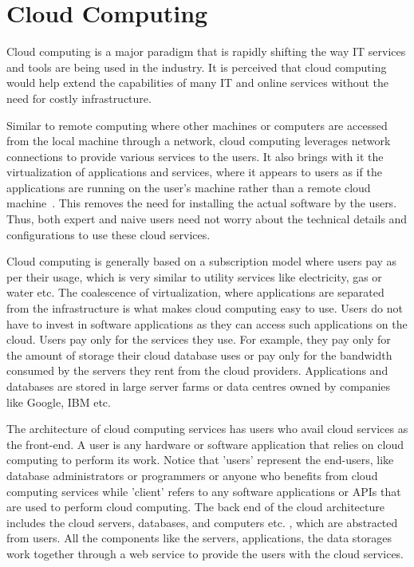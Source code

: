 \section{Cloud Computing} \label{s:cloudComputing}
Cloud computing is a major paradigm that is rapidly shifting the way \ac{IT}
services and tools are being used in the industry.  It is perceived that cloud
computing would help extend the capabilities of many \ac{IT} and online services
without the need for costly infrastructure.

Similar to remote computing where other machines or computers are accessed from
the local machine through a network,   cloud computing leverages network
connections to provide various services to the users.  It also brings with it
the virtualization of applications and services,   where it appears to users as
if the applications are running on the user's machine rather than a remote cloud
machine~\citep{cloudcomputingdefined}.  This removes the need for
installing the actual software by the users.  Thus,   both expert and naive
users need not worry about the technical details and configurations to use these
cloud services.

Cloud computing is generally based on a subscription model where users pay as
per their usage,   which is very similar to utility services like electricity,  
gas or water etc.  The coalescence of virtualization,   where applications are
separated from the infrastructure is what makes cloud computing easy to use.
Users do not have to invest in software applications as they can access such
applications on the cloud.  Users pay only for the services they use.  For
example,   they pay only for the amount of storage their cloud database uses or
pay only for the bandwidth consumed by the servers they rent from the cloud
providers.  Applications and databases are stored in large server farms or data
centres owned by companies like Google,  IBM etc.

The architecture of cloud computing services has users who avail cloud services
as the front-end. A user is any hardware or software application that relies on
cloud computing to perform its work. Notice that 'users' represent the
end-users,   like  database administrators or programmers or anyone who benefits
from cloud computing services while 'client' refers to any software applications
or \acp{API}  that are used to perform cloud computing. The back end of the
cloud architecture includes the cloud servers, databases,   and computers etc. ,
which are abstracted from users.  All the components like the servers,
applications, the data storages work together through a web service to provide
the users with the cloud services.

